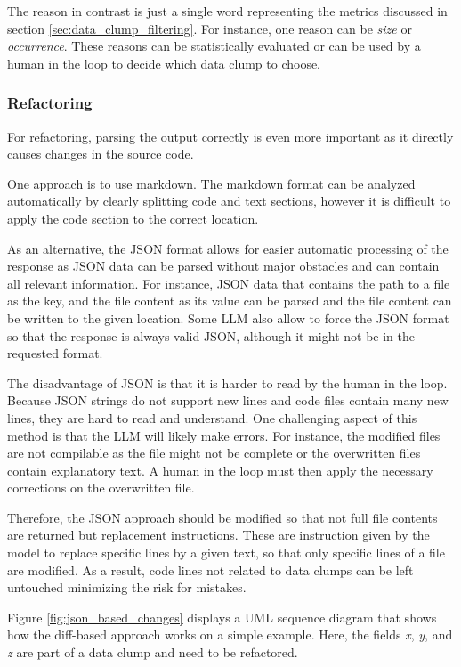  The reason in contrast is just a single word representing the metrics discussed in section \ref{sec:data_clump_filtering}. For instance, one reason can be \textit{size} or \textit{occurrence}. These reasons can be statistically evaluated or can be used by a human in the loop to decide which data clump to choose. 

\subsubsection{Refactoring}
For refactoring, parsing the output correctly is even more important as it directly causes changes in the source code.

One approach is to use markdown. The markdown format can be analyzed automatically by clearly splitting code and text sections, however it is difficult to apply the code section to the correct location. 

As an alternative, the \ac{JSON} format allows for easier automatic processing of the response as \ac{JSON} data can be parsed without major obstacles and can contain all relevant information. For instance, \ac{JSON} data that contains the path to a file as the key, and the file content as its value can be parsed and the file content can be written to the given location. Some \acs{LLM} also allow to force the \ac{JSON} format so that the response is always valid \ac{JSON}, although it might not be in the requested format. 

The disadvantage of \ac{JSON} is that it is harder to read by the human in the loop. Because \ac{JSON} strings do not support new lines and code files contain many new lines, they are hard to read and understand.
One challenging aspect of this method is that the \ac{LLM} will likely make errors. For instance, the modified files are not compilable as the file might not be complete or the  overwritten files contain explanatory text. A human in the loop must then apply the necessary corrections on the overwritten file.



Therefore, the \ac{JSON} approach should be modified so that not full file contents are returned but replacement instructions. These are instruction given by the model to replace specific lines by a given text, so that only specific lines of a file are modified.  As a result, code lines not related to data clumps can be left untouched minimizing the risk for mistakes. 


Figure \ref{fig:json_based_changes} displays a \ac{UML} sequence diagram that shows how the diff-based approach works on a simple example. Here, the fields \textit{x}, \textit{y}, and \textit{z} are part of a data clump and need to be refactored. 

